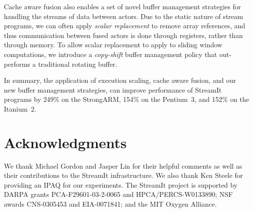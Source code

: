 \documentclass{sigplanconf}
\begin{document}
Cache aware fusion also enables a set of novel buffer management
strategies for handling the streams of data between actors. Due to the
static nature of stream programs, we can often apply {\it scalar
  replacement} to remove array references, and thus communication
between fused actors is done through registers, rather than through
memory.  To allow scalar replacement to apply to sliding window 
computations, we introduce a {\it copy-shift} buffer management policy
that out-performs a traditional rotating buffer.

In summary, the application of execution scaling, cache aware fusion, and our
new buffer management strategies, can improve performance of
StreamIt programs by 249\% on the StrongARM, 154\% on the Pentium~3,
and 152\% on the Itanium~2.


\section{Acknowledgments}
We thank Michael Gordon and Jasper Lin for their helpful comments as
well as their contributions to the StreamIt infrastructure.  We also
thank Ken Steele for providing an IPAQ for our experiments.  The
StreamIt project is supported by DARPA grants PCA-F29601-03-2-0065 and
HPCA/PERCS-W0133890; NSF awards CNS-0305453 and EIA-0071841; and the
MIT Oxygen Alliance.
\end{document}
